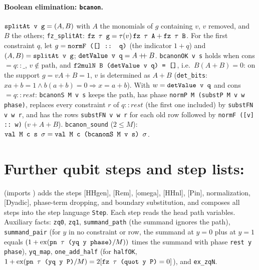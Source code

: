 \paragraph{Boolean elimination: \textnormal{\texttt{bcanon}}.} $\textnormal{\texttt{splitAt v g}} = (A,B)$ with $A$ the monomials
of $g$ containing $v$, $v$ removed, and $B$ the others; \textnormal{\texttt{fz\_\allowbreak{}splitAt}}:
$\textnormal{\texttt{fz \ensuremath{\tau} g}} = \tau(v)\,\textnormal{\texttt{fz \ensuremath{\tau} A}} + \textnormal{\texttt{fz \ensuremath{\tau} B}}$. For the first constraint $q$, let
$g = \textnormal{\texttt{normF (\allowbreak{}[] :: q)}}$ (the indicator $1+q$) and $(A,B) = \textnormal{\texttt{splitAt v g}}$;
$\textnormal{\texttt{detValue v q}} = A\mathbin{+\!\!+}B$. \textnormal{\texttt{bcanonOK v s}} holds when cons $= q :: \_$,
$v\notin\text{path}$, and $\textnormal{\texttt{f2mulN B (\allowbreak{}detValue v q) = []}}$, i.e.\ $B(A+B)=0$: on the support
$g=vA+B=1$, $v$ is determined as $A+B$ (\textnormal{\texttt{det\_\allowbreak{}bits}}: $xa+b=1\wedge b(a+b)=0\Rightarrow x=a+b$).
With $w=\textnormal{\texttt{detValue v q}}$ and cons $= q :: rest$:
\textnormal{\texttt{bcanonS M v s}} keeps the path, has phase \textnormal{\texttt{normP M (\allowbreak{}substP M v w phase)}}, replaces
every constraint $r$ of $q::rest$ (the first one included) by \textnormal{\texttt{substFN v w r}}, and has the
rows \textnormal{\texttt{substFN v w r}} for each old row followed by \textnormal{\texttt{normF (\allowbreak{}[v] :: w)}} ($v+A+B$).
\textnormal{\texttt{bcanon\_\allowbreak{}sound}} ($2\le M$): $\textnormal{\texttt{val M c s \ensuremath{\sigma}}} = \textnormal{\texttt{val M c (\allowbreak{}bcanonS M v s) \ensuremath{\sigma}}}$.

\section{Further qubit steps and step lists: \texorpdfstring{}{PathSumRules}}\label{sec:lean-pathsum-steps}

 (imports ) adds the steps [HHgen], [Rem], [omega], [HHnl],
[Pin], normalization, [Dyadic], phase-term dropping, and boundary substitution, and composes all
steps into the step language \textnormal{\texttt{Step}}. Each step reads the head path variables. Auxiliary
facts: \textnormal{\texttt{zq0}}, \textnormal{\texttt{zq1}}, \textnormal{\texttt{summand\_\allowbreak{}path}} (the summand ignores the path),
\textnormal{\texttt{summand\_\allowbreak{}pair}} (for $y$ in no constraint or row, the summand at $y=0$ plus at $y=1$ equals
$(1+\operatorname{ex}(\textnormal{\texttt{pn \ensuremath{\tau} (\allowbreak{}yq y phase)}}/M))$ times the summand with phase
\textnormal{\texttt{rest y phase}}), \textnormal{\texttt{yq\_\allowbreak{}map}}, \textnormal{\texttt{one\_\allowbreak{}add\_\allowbreak{}half}} (for \textnormal{\texttt{halfOK}},
$1+\operatorname{ex}(\textnormal{\texttt{pn \ensuremath{\tau} (\allowbreak{}yq y P)}}/M) = 2[\textnormal{\texttt{fz \ensuremath{\tau} (\allowbreak{}quot y P)}} = 0]$), and
\textnormal{\texttt{ex\_\allowbreak{}zqN}}.

